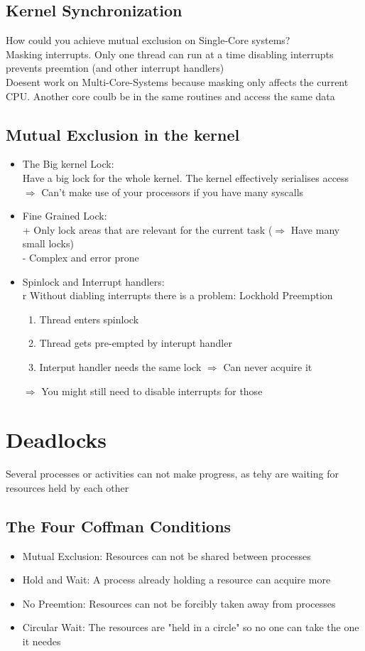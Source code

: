 \documentclass{kit}
\begin{document}
  \subsection{Kernel Synchronization}
    How could you achieve mutual exclusion on Single-Core systems?\\
    Masking interrupts. Only one thread can run at a time disabling interrupts prevents preemtion (and other interrupt
    handlers)\\
    Doesent work on Multi-Core-Systems because masking only affects the current CPU. Another core coulb be in the same
    routines and access the same data 
  \subsection{Mutual Exclusion in the kernel}
    \begin{itemize}
    \item The Big kernel Lock:\\
      Have a big lock for the whole kernel. The kernel effectively serialises access\\
      $\Rightarrow$ Can't make use of your processors if you have many syscalls
    \item Fine Grained Lock:\\
      + Only lock areas that are relevant for the current task ($\Rightarrow$ Have many small locks)\\
      - Complex and error prone
    \item Spinlock and Interrupt handlers:\\r
      Without diabling interrupts there is a problem: Lockhold Preemption
      \begin{enumerate}[label=\arabic*.]
        \item Thread enters spinlock
        \item Thread gets pre-empted by interupt handler
        \item Interput handler needs the same lock $\Rightarrow$ Can never acquire it
      \end{enumerate}
      $\Rightarrow$ You might still need to disable interrupts for those
    \end{itemize}
\section{Deadlocks}
  Several processes or activities can  not make progress, as tehy are waiting for resources held by each other
  \subsection{The Four Coffman Conditions}
    \begin{itemize}
      \item Mutual Exclusion: Resources can not be shared between processes
      \item Hold and Wait: A process already holding a resource can acquire more
      \item No Preemtion: Resources can not be forcibly taken away from processes
      \item Circular Wait: The resources are "held in a circle" so no one can take the one it needes
    \end{itemize}
\end{document}
